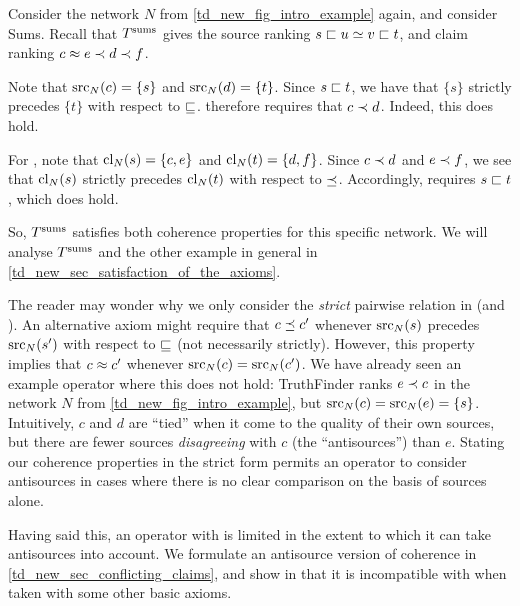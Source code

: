 \begin{example}
    \label{td_new_ex_coherence_ilustration}
    Consider the network $N$ from \cref{td_new_fig_intro_example} again, and
    consider Sums. Recall that $T^{\operatorname{sums}}$ gives the source ranking $s \sqsubset u \simeq
    v \sqsubset t$, and claim ranking $c \approx e \prec d \prec f$.

    Note that $\operatorname{src}_N(c) = \{s\}$ and $\operatorname{src}_N(d) = \{t\}$. Since $s \sqsubset t$, we
    have that $\{s\}$ strictly precedes $\{t\}$ with respect to $\sqsubseteq$.
    \claimcoherence{} therefore requires that $c \prec d$. Indeed, this does
    hold.

    For \sourcecoherence{}, note that $\operatorname{cl}_N(s) = \{c, e\}$ and
    $\operatorname{cl}_N(t) = \{d, f\}$. Since $c \prec d$ and $e \prec f$, we see that
    $\operatorname{cl}_N(s)$ strictly precedes $\operatorname{cl}_N(t)$ with respect to $\preceq$.
    Accordingly, \sourcecoherence{} requires $s \sqsubset t$, which does hold.

    So, $T^{\operatorname{sums}}$ satisfies both coherence properties for this specific network.
    We will analyse $T^{\operatorname{sums}}$ and the other example in general in
    \cref{td_new_sec_satisfaction_of_the_axioms}.
\end{example}

The reader may wonder why we only consider the \emph{strict} pairwise relation
in \claimcoherence{} (and \sourcecoherence{}). An alternative axiom might
require that $c \preceq c'$ whenever $\operatorname{src}_N(s)$ precedes $\operatorname{src}_N(s')$ with
respect to $\sqsubseteq$ (not necessarily strictly). However, this property implies
that $c \approx c'$ whenever $\operatorname{src}_N(c) = \operatorname{src}_N(c')$. We have already seen an
example operator where this does not hold: TruthFinder ranks $e \prec c$ in the
network $N$ from \cref{td_new_fig_intro_example}, but $\operatorname{src}_N(c) = \operatorname{src}_N(e) =
\{s\}$. Intuitively, $c$ and $d$ are ``tied'' when it come to the quality of
their own sources, but there are fewer sources \emph{disagreeing} with $c$ (the
``antisources'') than $e$. Stating our coherence properties in the strict form
permits an operator to consider antisources in cases where there is no clear
comparison on the basis of sources alone.

Having said this, an operator with \claimcoherence{} is limited in the extent
to which it can take antisources into account. We formulate an antisource
version of coherence in \cref{td_new_sec_conflicting_claims}, and show in that
it is incompatible with \claimcoherence{} when taken with some other basic
axioms.


